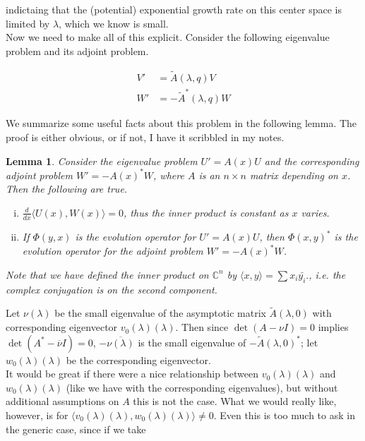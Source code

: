 \documentclass[12pt]{article}
\def\C{{\mathbb C}}
\newtheorem{lemma}{Lemma}
\begin{document}
indictaing that the (potential) exponential growth rate on this center space is limited by $\lambda$, which we know is small.\\

Now we need to make all of this explicit. Consider the following eigenvalue problem and its adjoint problem.

\begin{align}
V' &= \tilde{A}(\lambda, q)V \label{eig:V} \\
W' &= -\tilde{A}^*(\lambda, q)W \label{eig:W}
\end{align}

We summarize some useful facts about this problem in the following lemma. The proof is either obvious, or if not, I have it scribbled in my notes.

\begin{lemma}\label{eigadjoint}
Consider the eigenvalue problem $U' = A(x)U$ and the corresponding adjoint problem $W' = -A(x)^* W$, where $A$ is an $n \times n$ matrix depending on $x$. Then the following are true.
\begin{enumerate}[(i)]
\item $\frac{d}{dx}\langle U(x), W(x) \rangle = 0$, thus the inner product is constant as $x$ varies.
\item If $\Phi(y, x)$ is the evolution operator for $U' = A(x)U$, then $\Phi(x, y)^*$ is the evolution operator for the adjoint problem $W' = -A(x)^* W$.
\end{enumerate}
Note that we have defined the inner product on $\C^n$ by $\langle x, y \rangle = \sum x_i \bar{y_i}.$, i.e. the complex conjugation is on the second component.
\end{lemma}

Let $\nu(\lambda)$ be the small eigenvalue of the asymptotic matrix $\tilde{A}(\lambda,0)$ with corresponding eigenvector $v_0(\lambda)(\lambda)$. Then since $\det(A - \nu I) = 0$ implies $\det(A^* - \overline{\nu}I) = 0$, $-\overline{\nu(\lambda)}$ is the small eigenvalue of $-\tilde{A}(\lambda,0)^*$; let $w_0(\lambda)(\lambda)$ be the corresponding eigenvector.\\

It would be great if there were a nice relationship between $v_0(\lambda)(\lambda)$ and $w_0(\lambda)(\lambda)$ (like we have with the corresponding eigenvalues), but without additional assumptions on $A$ this is not the case. What we would really like, however, is for $\langle v_0(\lambda)(\lambda), w_0(\lambda)(\lambda) \rangle \neq 0$. Even this is too much to ask in the generic case, since if we take
\end{document}
